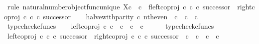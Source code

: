 \begin{isabellebody}
%
\isadelimproof
%
\endisadelimproof
%
\isatagproof
{}\isamarkupfalse%
\ {\isacharparenleft}{\kern0pt}rule\ natural{\isacharunderscore}{\kern0pt}number{\isacharunderscore}{\kern0pt}object{\isacharunderscore}{\kern0pt}func{\isacharunderscore}{\kern0pt}unique{\isacharbrackleft}{\kern0pt}\ X{\isacharequal}{\kern0pt}{\isachardoublequoteopen}{\isasymnat}\isactrlsub c\ {\isasymCoprod}\ {\isasymnat}\isactrlsub c{\isachardoublequoteclose}{\isacharcomma}{\kern0pt}\ \ f{\isacharequal}{\kern0pt}{\isachardoublequoteopen}{\isacharparenleft}{\kern0pt}left{\isacharunderscore}{\kern0pt}coproj\ {\isasymnat}\isactrlsub c\ {\isasymnat}\isactrlsub c\ {\isasymcirc}\isactrlsub c\ successor{\isacharparenright}{\kern0pt}\ {\isasymamalg}\ {\isacharparenleft}{\kern0pt}right{\isacharunderscore}{\kern0pt}coproj\ {\isasymnat}\isactrlsub c\ {\isasymnat}\isactrlsub c\ {\isasymcirc}\isactrlsub c\ successor{\isacharparenright}{\kern0pt}{\isachardoublequoteclose}{\isacharbrackright}{\kern0pt}{\isacharparenright}{\kern0pt}\isanewline
\ \ \isamarkupfalse%
\ {\isachardoublequoteopen}halve{\isacharunderscore}{\kern0pt}with{\isacharunderscore}{\kern0pt}parity\ {\isasymcirc}\isactrlsub c\ nth{\isacharunderscore}{\kern0pt}even\ {\isacharcolon}{\kern0pt}\ {\isasymnat}\isactrlsub c\ {\isasymrightarrow}\ {\isasymnat}\isactrlsub c\ {\isasymCoprod}\ {\isasymnat}\isactrlsub c{\isachardoublequoteclose}\isanewline
\ \ \ \ \isamarkupfalse%
\ typecheck{\isacharunderscore}{\kern0pt}cfuncs\isanewline
\ \ \isamarkupfalse%
\ {\isachardoublequoteopen}left{\isacharunderscore}{\kern0pt}coproj\ {\isasymnat}\isactrlsub c\ {\isasymnat}\isactrlsub c\ {\isacharcolon}{\kern0pt}\ {\isasymnat}\isactrlsub c\ {\isasymrightarrow}\ {\isasymnat}\isactrlsub c\ {\isasymCoprod}\ {\isasymnat}\isactrlsub c{\isachardoublequoteclose}\isanewline
\ \ \ \ \isamarkupfalse%
\ typecheck{\isacharunderscore}{\kern0pt}cfuncs\isanewline
\ \ \isamarkupfalse%
\ {\isachardoublequoteopen}{\isacharparenleft}{\kern0pt}left{\isacharunderscore}{\kern0pt}coproj\ {\isasymnat}\isactrlsub c\ {\isasymnat}\isactrlsub c\ {\isasymcirc}\isactrlsub c\ successor{\isacharparenright}{\kern0pt}\ {\isasymamalg}\ {\isacharparenleft}{\kern0pt}right{\isacharunderscore}{\kern0pt}coproj\ {\isasymnat}\isactrlsub c\ {\isasymnat}\isactrlsub c\ {\isasymcirc}\isactrlsub c\ successor{\isacharparenright}{\kern0pt}\ {\isacharcolon}{\kern0pt}\ {\isasymnat}\isactrlsub c\ {\isasymCoprod}\ {\isasymnat}\isactrlsub c\ {\isasymrightarrow}\ {\isasymnat}\isactrlsub c\ {\isasymCoprod}\ {\isasymnat}\isactrlsub c{\isachardoublequoteclose}\isanewline

\end{isabellebody}
